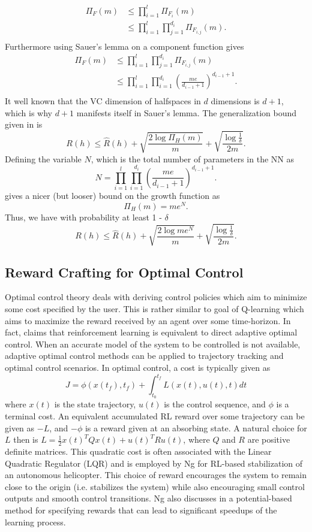 \documentclass{article} %
\begin{document}
\begin{align*}
\Pi_F(m) &\leq \prod_{i=1}^l \Pi_{F_i}(m)\\
& \leq \prod_{i=1}^l\prod_{j=1}^{d_i} \Pi_{F_{i,j}}(m).\\
\end{align*}
Furthermore using Sauer's lemma on a component function gives
\begin{align*}
\Pi_F(m)& \leq \prod_{i=1}^l\prod_{j=1}^{d_i} \Pi_{F_{i,j}}(m)\\
& \leq \prod_{i=1}^l\prod_{i=1}^{d_i}(\frac{me}{d_{i-1}+1})^{d_{i-1}+1}.\\
\end{align*}
It well known that the VC dimension of halfspaces in $d$ dimensions is $d +1$, which is why $d+1$ manifests itself in Sauer's lemma.
The generalization bound given in \cite{mohri} is 
$$
R(h) \leq \widehat{R}(h) + \sqrt{\frac{2\log{\Pi_H{(m)}}}{m}} + \sqrt{\frac{\log{\frac{1}{\delta}}}{2m}}.
$$
Defining the variable $N$, which is the total number of parameters in the NN as 
$$
N = \prod_{i=1}^l\prod_{i=1}^{d_i}(\frac{me}{d_{i-1}+1})^{d_{i-1}+1}.
$$ 
gives a nicer (but looser) bound on the growth function as
$$
\Pi_H{(m)} = me^N.
$$
Thus, we have with probability at least 1 - $\delta$
$$
R(h) \leq \widehat{R}(h) + \sqrt{\frac{2\log{me^N}}{m}} + \sqrt{\frac{\log{\frac{1}{\delta}}}{2m}}.
$$

\subsection{Reward Crafting for Optimal Control}
Optimal control theory deals with deriving control policies which aim to minimize some cost specified by the user.  This is rather similar to goal of Q-learning which aims to maximize the reward received by an agent over some time-horizon.  In fact, \cite{sutton} claims that reinforcement learning is equivalent to direct adaptive optimal control.  When an accurate model of the system to be controlled is not available, adaptive optimal control methods can be applied to trajectory tracking and optimal control scenarios.  In optimal control, a cost is typically given as 
$$J = \phi(x(t_f),t_f) + \int_{t_0}^{t_f} L(x(t),u(t),t)dt$$
where $x(t)$ is the state trajectory, $u(t)$ is the control sequence, and $\phi$ is a terminal cost.  An equivalent accumulated RL reward over some trajectory can be given as $-L$, and $-\phi$ is a reward given at an absorbing state.  A natural choice for $L$ then is $L = \frac{1}{2}x(t)^TQx(t) + u(t)^TRu(t)$, where $Q$ and $R$ are positive definite matrices.  This quadratic cost is often associated with the Linear Quadratic Regulator (LQR) \cite{lqr} and is employed by Ng \cite{ng_autonomous_2006} for RL-based stabilization of an autonomous helicopter.  This choice of reward encourages the system to remain close to the origin (i.e. stabilizes the system) while also encouraging small control outputs and smooth control transitions.  Ng also discusses in \cite{ng_thesis} a potential-based method for specifying rewards that can lead to significant speedups of the learning process.
\end{document}
